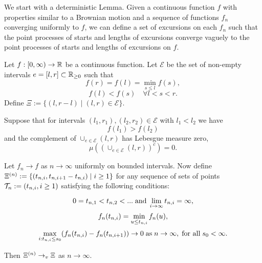 
We start with a deterministic Lemma.
Given a continuous function $f$ with properties similar to a Brownian motion
and a sequence of functions $f_n$ converging uniformly to $f$,
we can define a set of excursions on each $f_n$ such that
the point processes of starts and lengths of excursions converge vaguely to the point processes of starts and lengths of excursions on $f$.

\begin{lemma} \label{L: Deterministic Lemma}
	Let $f:[0, \infty) \rightarrow \mathbb{R}$ be a continuous function. 
	Let $\mathcal{E}$ be the set of non-empty intervals 
	$e=[l,r] \subset \mathbb{R}_{\geq 0}$
	such that
	\begin{equation} \label{E: f cond 1}
	f(r) = f(l) = \min_{s \leq l} f(s),
	\end{equation}
	\begin{equation} \label{E: f cond 2}
	f(l) < f(s) \quad \forall l < s < r.
	\end{equation}
	Define $\Xi := \lbrace (l, r-l) \; | \; (l, r) \in \mathcal{E} \rbrace$.
	
	Suppose that for intervals $(l_1, r_1), (l_2, r_2) \in \mathcal{E}$ with $l_1 < l_2$ we have 
	\begin{equation} \label{E: f cond f(l1) > f(l2)}
	f(l_1) > f(l_2)
	\end{equation}
	and the complement of $\cup_{e \in \mathcal{E}} (l,r)$ has Lebesgue measure zero,
	\begin{equation} \label{E: f cond complement zero}
	\mu \left( \left( \cup_{e \in \mathcal{E}} (l,r) \right)^c\right) = 0.
	\end{equation}
	
	Let $f_n \rightarrow f$ as $n \rightarrow \infty$ uniformly on bounded intervals.
	Now define $\Xi^{(n)} := \lbrace (t_{n, i}, t_{n, i+1} - t_{n, i}) \; | \; i \geq 1 \rbrace$
	for any sequence of sets of points $\mathcal{T}_n := (t_{n, i}, i \geq 1)$ satisfying the following conditions:
	
	\begin{equation} \label{E: fn cond 3}
	0 = t_{n, 1} < t_{n, 2} < ... \; \text{and} \; \lim_{i \rightarrow \infty} t_{n, i} = \infty,
	\end{equation}
	\begin{equation} \label{E: fn cond 4}
	f_n(t_{n, i}) = \min_{u \leq t_{n, i}}f_n(u), 
	\end{equation}
	\begin{equation} \label{E: fn cond 5}
	\max_{i: t_{n, i} \leq s_0}(f_n(t_{n, i}) - f_n(t_{n, i+1})) \rightarrow 0 \; \text{as} \; n \rightarrow \infty, \; \text{for all} \; s_0 < \infty.
	\end{equation}
	
	Then $\Xi^{(n)} \rightarrow_v \Xi$ as $n \rightarrow \infty$.
\end{lemma}

